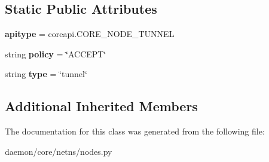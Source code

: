 \subsection*{Static Public Attributes}
\begin{DoxyCompactItemize}
\item 
\hypertarget{classcore_1_1netns_1_1nodes_1_1_tunnel_node_ad23d88ef3af9fb13dd16a873df05e57c}{{\bfseries apitype} = coreapi.\+C\+O\+R\+E\+\_\+\+N\+O\+D\+E\+\_\+\+T\+U\+N\+N\+E\+L}\label{classcore_1_1netns_1_1nodes_1_1_tunnel_node_ad23d88ef3af9fb13dd16a873df05e57c}

\item 
\hypertarget{classcore_1_1netns_1_1nodes_1_1_tunnel_node_a4b9c7680aa11ccaef79d48fe7526a969}{string {\bfseries policy} = \char`\"{}A\+C\+C\+E\+P\+T\char`\"{}}\label{classcore_1_1netns_1_1nodes_1_1_tunnel_node_a4b9c7680aa11ccaef79d48fe7526a969}

\item 
\hypertarget{classcore_1_1netns_1_1nodes_1_1_tunnel_node_a34a1cb5b9816a830df9b411c89efef80}{string {\bfseries type} = \char`\"{}tunnel\char`\"{}}\label{classcore_1_1netns_1_1nodes_1_1_tunnel_node_a34a1cb5b9816a830df9b411c89efef80}

\end{DoxyCompactItemize}
\subsection*{Additional Inherited Members}


The documentation for this class was generated from the following file\+:\begin{DoxyCompactItemize}
\item 
daemon/core/netns/nodes.\+py\end{DoxyCompactItemize}
